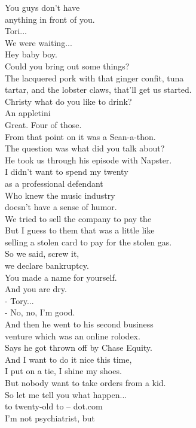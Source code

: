 \documentclass{article}
\begin{document}
\begin{multicols}{3}
You guys don't have\\
anything in front of you.\\
Tori...\\
We were waiting...\\
Hey baby boy.\\
Could you bring out some things?\\
The lacquered pork with that ginger confit, tuna\\
tartar, and the lobster claws, that'll get us started.\\
Christy what do you like to drink?\\
An appletini\\
Great. Four of those.\\
From that point on it was a Sean-a-thon.\\
The question was what did you talk about?\\
He took us through his episode with Napster.\\
I didn't want to spend my twenty\\
as a professional defendant\\
Who knew the music industry\\
doesn't have a sense of humor.\\
We tried to sell the company to pay the\\
But I guess to them that was a little like\\
selling a stolen card to pay for the stolen gas.\\
So we said, screw it,\\
we declare bankruptcy.\\
You made a name for yourself.\\
And you are dry.\\
- Tory...\\
- No, no, I'm good.\\
And then he went to his second business\\
venture which was an online rolodex.\\
Says he got thrown off by Chase Equity.\\
And I want to do it nice this time,\\
I put on a tie, I shine my shoes.\\
But nobody want to take orders from a kid.\\
So let me tell you what happen...\\
to twenty-old to -- dot.com\\
I'm not psychiatrist, but\\

\end{multicols}
\end{document}
